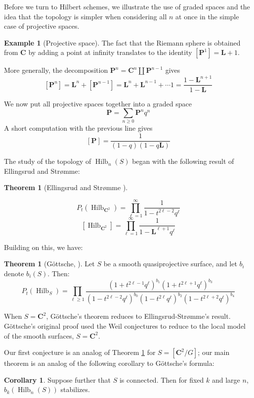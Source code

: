 \documentclass{amsart}[12pt]
\theoremstyle{definition}
\newtheorem{theorem}[dummy]{Theorem}
\newtheorem{example}[dummy]{Example}
\newtheorem{corollary}[dummy]{Corollary}
\newcommand{\C}{\mathbf{C}}
\newcommand{\LL}{\mathbf{L}}
\newcommand{\proj}{\mathbf{P}}
\DeclareMathOperator{\Hilb}{Hilb}
\newcommand{\HG}{\Hilb}
\begin{document}
Before we turn to Hilbert schemes, we illustrate the use of graded spaces and the idea that the topology is simpler when considering all $n$ at once in the simple case of projective spaces.


\begin{example}[Projective space]
The fact that the Riemann sphere is obtained from $\C$ by adding a point at infinity translates to the identity $[\proj^1]=\LL+1$.

More generally, the decomposition $\proj^n=\C^n\amalg \proj^{n-1}$ gives
$$[\proj^n]=\LL^n+[\proj^{n-1}]=\LL^n+\LL^{n-1}+\cdots 1=\frac{1-\LL^{n+1}}{1-\LL}$$


We now put all projective spaces together into a graded space 
$$\proj=\sum_{n\geq 0} \proj^nq^n$$ 
A short computation with the previous line gives
$$[\proj]=\frac{1}{(1-q)(1-q\LL)}$$

\end{example}


The study of the topology of $\Hilb_n(S)$ began with the following result of Ellingsrud and Str\o mme:
\begin{theorem}[Ellingsrud and Str\o mme \cite{ES}] \label{thm:ES}

$$P_t(\HG_{\C^2})=\prod_{\ell=1}^\infty \frac{1}{1-t^{2\ell-2}q^\ell}$$
$$[\HG_{\C^2}]=\prod_{\ell=1}^\infty \frac{1}{1-\LL^{\ell +1}q^\ell}$$
\end{theorem}

Building on this, we have:

\begin{theorem}[G\"ottsche, \cite{gottsche}] \label{thm:gprod}
Let $S$ be a smooth quasiprojective surface, and let $b_i$ denote $b_i(S)$.  Then:
$$P_t(\HG_S)=\prod_{\ell\geq 1} \frac{(1+t^{2\ell-1}q^\ell)^{b_1}(1+t^{2\ell+1}q^\ell)^{b_3}}{(1-t^{2\ell-2}q^\ell)^{b_0}(1-t^{2\ell}q^\ell)^{b_2}(1-t^{2\ell+2}q^\ell)^{b_4}}$$
\end{theorem}

When $S=\C^2$, G\"ottsche's theorem reduces to Ellingsrud-Str\o mme's result.  G\"ottsche's original proof used the Weil conjectures to reduce to the local model of the smooth surfaces, $S=\C^2$.  

Our first conjecture is an analog of Theorem \ref{thm:gprod} for $S=[\C^2/G]$; our main theorem is an analog of the following corollary to G\"ottsche's formula:

\begin{corollary} \label{cor:gstab} Suppose further that $S$ is connected.
Then for fixed $k$ and large $n$, $b_{k}(\Hilb_n(S))$ stabilizes.
\end{corollary}
\end{document}
